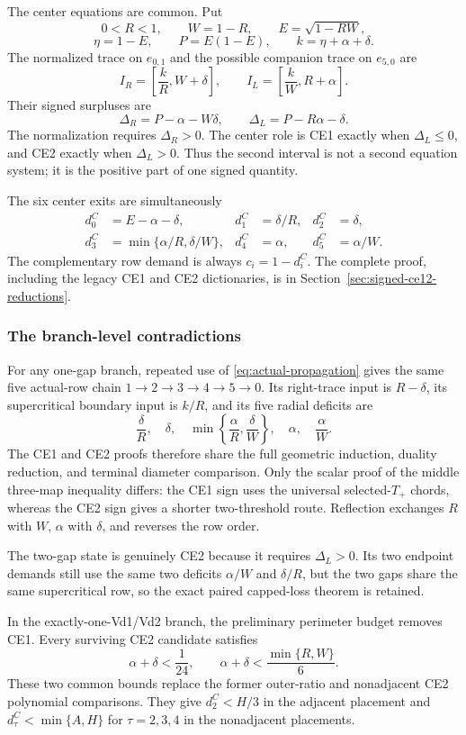 The center equations are common. Put
\[
 0<R<1,\qquad W=1-R,\qquad E=\sqrt{1-RW},
\]
\[
 \eta=1-E,\qquad P=E(1-E),\qquad
 k=\eta+\alpha+\delta.
\]
The normalized trace on $e_{0,1}$ and the possible companion trace on
$e_{5,0}$ are
\[
 I_R=\left[\frac{k}{R},W+\delta\right],\qquad
 I_L=\left[\frac{k}{W},R+\alpha\right].
\]
Their signed surpluses are
\[
 \Delta_R=P-\alpha-W\delta,\qquad
 \Delta_L=P-R\alpha-\delta.
\]
The normalization requires $\Delta_R>0$. The center role is CE1 exactly when
$\Delta_L\le0$, and CE2 exactly when $\Delta_L>0$. Thus the second interval
is not a second equation system; it is the positive part of one signed
quantity.

The six center exits are simultaneously
\[
 \begin{aligned}
 d_0^C&=E-\alpha-\delta,&
 d_1^C&=\delta/R,&
 d_2^C&=\delta,\\
 d_3^C&=\min\{\alpha/R,\delta/W\},&
 d_4^C&=\alpha,&
 d_5^C&=\alpha/W.
 \end{aligned}
\]
The complementary row demand is always $c_i=1-d_i^C$. The complete proof,
including the legacy CE1 and CE2 dictionaries, is in
Section~\ref{sec:signed-ce12-reductions}.

\subsubsection{The branch-level contradictions}

For any one-gap branch, repeated use of \eqref{eq:actual-propagation} gives the
same five actual-row chain $1\to2\to3\to4\to5\to0$. Its right-trace input is
$R-\delta$, its supercritical boundary input is $k/R$, and its five radial
deficits are
\[
 \frac\delta R,\quad \delta,\quad
 \min\left\{\frac\alpha R,\frac\delta W\right\},
 \quad\alpha,\quad\frac\alpha W.
\]
The CE1 and CE2 proofs therefore share the full geometric induction, duality
reduction, and terminal diameter comparison. Only the scalar proof of the
middle three-map inequality differs: the CE1 sign uses the universal
selected-$T_+$ chords, whereas the CE2 sign gives a shorter two-threshold
route. Reflection exchanges $R$ with $W$, $\alpha$ with $\delta$, and reverses
the row order.

The two-gap state is genuinely CE2 because it requires $\Delta_L>0$. Its two
endpoint demands still use the same two deficits $\alpha/W$ and $\delta/R$,
but the two gaps share the same supercritical row, so the exact paired
capped-loss theorem is retained.

In the exactly-one-Vd1/Vd2 branch, the preliminary perimeter budget removes
CE1. Every surviving CE2 candidate satisfies
\[
 \alpha+\delta<\frac1{24},\qquad
 \alpha+\delta<\frac{\min\{R,W\}}6.
\]
These two common bounds replace the former outer-ratio and nonadjacent CE2
polynomial comparisons. They give $d_2^C<H/3$ in the adjacent placement and
$d_\tau^C<\min\{A,H\}$ for $\tau=2,3,4$ in the nonadjacent placements.

